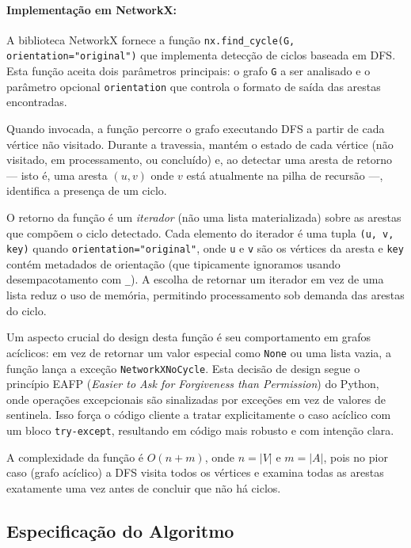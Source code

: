 \paragraph{Implementação em NetworkX:} A biblioteca NetworkX fornece a função \texttt{nx.find\_cycle(G, orientation="original")} que implementa detecção de ciclos baseada em DFS. Esta função aceita dois parâmetros principais: o grafo \texttt{G} a ser analisado e o parâmetro opcional \texttt{orientation} que controla o formato de saída das arestas encontradas.

Quando invocada, a função percorre o grafo executando DFS a partir de cada vértice não visitado. Durante a travessia, mantém o estado de cada vértice (não visitado, em processamento, ou concluído) e, ao detectar uma aresta de retorno — isto é, uma aresta \((u,v)\) onde \(v\) está atualmente na pilha de recursão —, identifica a presença de um ciclo.

O retorno da função é um \emph{iterador} (não uma lista materializada) sobre as arestas que compõem o ciclo detectado. Cada elemento do iterador é uma tupla \texttt{(u, v, key)} quando \texttt{orientation="original"}, onde \texttt{u} e \texttt{v} são os vértices da aresta e \texttt{key} contém metadados de orientação (que tipicamente ignoramos usando desempacotamento com \texttt{\_}). A escolha de retornar um iterador em vez de uma lista reduz o uso de memória, permitindo processamento sob demanda das arestas do ciclo.

Um aspecto crucial do design desta função é seu comportamento em grafos acíclicos: em vez de retornar um valor especial como \texttt{None} ou uma lista vazia, a função lança a exceção \texttt{NetworkXNoCycle}. Esta decisão de design segue o princípio EAFP (\emph{Easier to Ask for Forgiveness than Permission}) do Python, onde operações excepcionais são sinalizadas por exceções em vez de valores de sentinela. Isso força o código cliente a tratar explicitamente o caso acíclico com um bloco \texttt{try-except}, resultando em código mais robusto e com intenção clara.

A complexidade da função é \(O(n+m)\), onde \(n=|V|\) e \(m=|A|\), pois no pior caso (grafo acíclico) a DFS visita todos os vértices e examina todas as arestas exatamente uma vez antes de concluir que não há ciclos.

\subsection{Especificação do Algoritmo}


